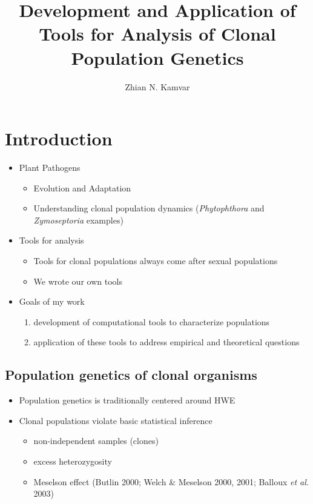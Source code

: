 \documentclass[double,12pt]{beavtex}
\title{Development and Application of Tools for Analysis of Clonal Population
Genetics} %
\author{Zhian N. Kamvar} %
\providecommand{\tightlist}{%
  \setlength{\itemsep}{0pt}\setlength{\parskip}{0pt}}
\begin{document}
\maketitle
\mainmatter


  \chapter{Introduction}\label{introduction}
  
  \begin{itemize}
  \tightlist
  \item
    Plant Pathogens
  
    \begin{itemize}
    \tightlist
    \item
      Evolution and Adaptation
    \item
      Understanding clonal population dynamics (\emph{Phytophthora} and
      \emph{Zymoseptoria} examples)
    \end{itemize}
  \item
    Tools for analysis
  
    \begin{itemize}
    \tightlist
    \item
      Tools for clonal populations always come after sexual populations
    \item
      We wrote our own tools
    \end{itemize}
  \item
    Goals of my work
  
    \begin{enumerate}
    \def\labelenumi{\arabic{enumi}.}
    \tightlist
    \item
      development of computational tools to characterize populations
    \item
      application of these tools to address empirical and theoretical
      questions
    \end{enumerate}
  \end{itemize}
  
  \section{Population genetics of clonal
  organisms}\label{population-genetics-of-clonal-organisms}
  
  \begin{itemize}
  \tightlist
  \item
    Population genetics is traditionally centered around HWE
  \item
    Clonal populations violate basic statistical inference
  
    \begin{itemize}
    \tightlist
    \item
      non-independent samples (clones)
    \item
      excess heterozygosity
    \item
      Meselson effect (Butlin 2000; Welch \& Meselson 2000, 2001; Balloux
      \emph{et al.} 2003)
    \end{itemize}
  \end{itemize}
  
\end{document}
